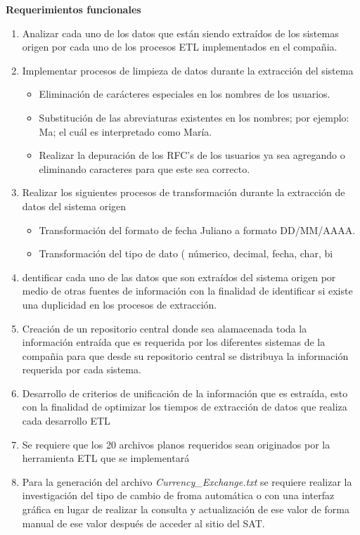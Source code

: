 \textbf{Requerimientos funcionales}

\begin{enumerate}
\item Analizar cada uno de los datos que están siendo extraídos de los sistemas origen por cada uno de los procesos ETL implementados en el compañia.
\item Implementar procesos de limpieza de datos durante la extracción del sistema
\begin {itemize}
\item Eliminación de carácteres especiales en los nombres de los usuarios.
\item Substitución de las abreviaturas existentes en los nombres; por ejemplo: Ma; el cuál es interpretado como María.
\item Realizar la depuración de los RFC's de los usuarios ya sea agregando o eliminando caracteres para que este sea correcto.
\end{itemize}
\item Realizar los siguientes procesos de transformación durante la extracción de datos del sistema origen
\begin {itemize}
\item Transformación del formato de fecha Juliano a formato DD/MM/AAAA.
\item Transformación del tipo de dato ( númerico, decimal, fecha, char, bi
\end{itemize}
\item dentificar cada uno de las datos que son extraídos del sistema origen por medio de otras fuentes de información con la finalidad de identificar si existe una duplicidad en los procesos de extracción.
\item Creación de un repositorio central donde sea alamacenada toda la información entraída que es requerida por los diferentes sistemas de la compañia para que desde su repositorio central se distribuya la información requerida por cada sistema.
\item Desarrollo de criterios de unificación de la información que es estraída, esto con la finalidad de optimizar los tiempos de extracción de datos que realiza cada desarrollo ETL
\item Se requiere que los 20 archivos planos requeridos sean originados por la herramienta ETL que se implementará
\item Para la generación del archivo \textit{Currency\_Exchange.txt} se requiere realizar la investigación del tipo de cambio de froma automática o con una interfaz gráfica en lugar de realizar la consulta y actualización de ese valor de forma manual de ese valor después de acceder al sitio del SAT.

\end{enumerate}

